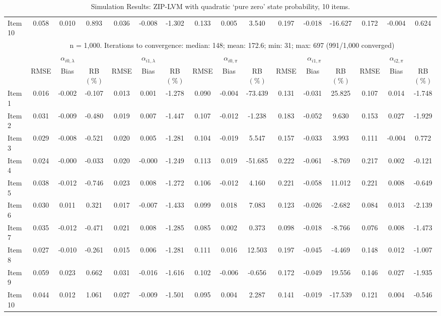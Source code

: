 \documentclass[11pt, a4paper]{article}
\begin{document}
\begin{table}[h!]
{{\begin{tabular}{lccccccccccccccc}
  Item 10 & 0.058 & 0.010 & 0.893 & 0.036 & -0.008 & -1.302 & 0.133 & 0.005 & 3.540 & 0.197 & -0.018 & -16.627 & 0.172 & -0.004 & 0.624 \\ 
\cmidrule(lr){2-16}
& \multicolumn{15}{c}{\multirow{2}{*}{n = 1,000. Iterations to convergence: median: 148; mean: 172.6; min: 31; max: 697 (991/1,000 converged)}} \\ & \\
\cmidrule(lr){2-16}
& \multicolumn{3}{c}{$\alpha_{i0,\lambda}$} & \multicolumn{3}{c}{$\alpha_{i1,\lambda}$} & \multicolumn{3}{c}{$\alpha_{i0,\pi}$} & \multicolumn{3}{c}{$\alpha_{i1,\pi}$} & \multicolumn{3}{c}{$\alpha_{i2,\pi}$}\\ 
& RMSE & Bias & RB $(\%)$ & RMSE & Bias & RB $(\%)$ & RMSE & Bias & RB $(\%)$ & RMSE & Bias & RB $(\%)$ & RMSE & Bias & RB $(\%)$ \\ \cmidrule(lr){2-4} \cmidrule(lr){5-7} \cmidrule(lr){8-10} \cmidrule(lr){11-13} \cmidrule(lr){14-16}
Item 1 & 0.016 & -0.002 & -0.107 & 0.013 & 0.001 & -1.278 & 0.090 & -0.004 & -73.439 & 0.131 & -0.031 & 25.825 & 0.107 & 0.014 & -1.748 \\ 
Item 2 & 0.031 & -0.009 & -0.480 & 0.019 & 0.007 & -1.447 & 0.107 & -0.012 & -1.238 & 0.183 & -0.052 & 9.630 & 0.153 & 0.027 & -1.929 \\ 
Item 3 & 0.029 & -0.008 & -0.521 & 0.020 & 0.005 & -1.281 & 0.104 & -0.019 & 5.547 & 0.157 & -0.033 & 3.993 & 0.111 & -0.004 & 0.772 \\ 
Item 4 & 0.024 & -0.000 & -0.033 & 0.020 & -0.000 & -1.249 & 0.113 & 0.019 & -51.685 & 0.222 & -0.061 & -8.769 & 0.217 & 0.002 & -0.121 \\ 
Item 5 & 0.038 & -0.012 & -0.746 & 0.023 & 0.008 & -1.272 & 0.106 & -0.012 & 4.160 & 0.221 & -0.058 & 11.012 & 0.221 & 0.008 & -0.649 \\ 
Item 6 & 0.030 & 0.011 & 0.321 & 0.017 & -0.007 & -1.433 & 0.099 & 0.018 & 7.083 & 0.123 & -0.026 & -2.682 & 0.084 & 0.013 & -2.139 \\ 
Item 7 & 0.035 & -0.012 & -0.471 & 0.021 & 0.008 & -1.285 & 0.085 & 0.002 & 0.373 & 0.098 & -0.018 & -8.766 & 0.076 & 0.008 & -1.473 \\ 
Item 8 & 0.027 & -0.010 & -0.261 & 0.015 & 0.006 & -1.281 & 0.111 & 0.016 & 12.503 & 0.197 & -0.045 & -4.469 & 0.148 & 0.012 & -1.007 \\ 
Item 9 & 0.059 & 0.023 & 0.662 & 0.031 & -0.016 & -1.616 & 0.102 & -0.006 & -0.656 & 0.172 & -0.049 & 19.556 & 0.146 & 0.027 & -1.935 \\ 
Item 10 & 0.044 & 0.012 & 1.061 & 0.027 & -0.009 & -1.501 & 0.095 & 0.004 & 2.287 & 0.141 & -0.019 & -17.539 & 0.121 & 0.004 & -0.546 \\ 
\cmidrule(lr){2-16}
\end{tabular}%
} %
} %
\caption{Simulation Results: ZIP-LVM with quadratic `pure zero' state probability, 10 items.}
\label{tab:A1Sim3}
\end{table}

\clearpage



\end{document}

